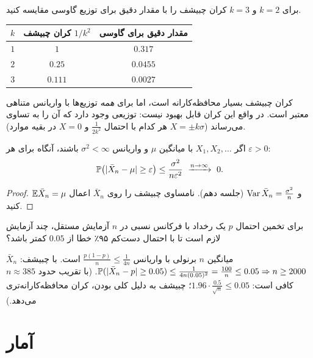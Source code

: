 \begin{example}
برای $k=2$ و $k=3$ کران چبیشف را با مقدار دقیق برای توزیع گاوسی مقایسه کنید.
\begin{solution}
\begin{center}
\renewcommand{\arraystretch}{1.3}
\begin{tabular}{c|c|c}
$k$ & کران چبیشف $1/k^2$ & مقدار دقیق برای گاوسی\\\hline
$1$ & $1$ & $0.317$\\
$2$ & $0.25$ & $0.0455$\\
$3$ & $0.111$ & $0.0027$
\end{tabular}
\end{center}
کران چبیشف بسیار محافظه‌کارانه است، اما برای \emph{همه} توزیع‌ها با واریانس متناهی معتبر است. در واقع این کران قابل بهبود نیست: توزیعی وجود دارد که آن را به تساوی می‌رساند ($X=\pm k\sigma$ هر کدام با احتمال $\frac1{2k^2}$ و $X=0$ در بقیه موارد).
\end{solution}
\end{example}

\begin{theorem}
اگر $X_1,X_2,\ldots$  با میانگین $\mu$ و واریانس $\sigma^2<\infty$ باشند، آنگاه برای هر $\varepsilon>0$:
\[
\Prob\big(|\bar X_n-\mu|\ge\varepsilon\big)\le\frac{\sigma^2}{n\varepsilon^2}\ \xrightarrow{n\to\infty}\ 0 .
\]
\end{theorem}
\begin{proof}
$\mathbb{E}\bar X_n=\mu$ و $\operatorname{Var}\bar X_n=\frac{\sigma^2}{n}$ (جلسه دهم). نامساوی چبیشف را روی $\bar X_n$ اعمال کنید.
\end{proof}

\begin{example}
برای تخمین احتمال $p$ یک رخداد با فرکانس نسبی در $n$ آزمایش مستقل، چند آزمایش لازم است تا با احتمال دست‌کم ۹۵٪ خطا از $0.05$ کمتر باشد؟
\begin{solution}
$\bar X_n$ میانگین $n$ برنولی با واریانس $\frac{p(1-p)}{n}\le\frac{1}{4n}$ است. با چبیشف:
$\mathbb{P}(|\bar X_n-p|\ge0.05)\le\frac{1}{4n(0.05)^2}=\frac{100}{n}\le0.05\Rightarrow n\ge2000$.
(با تقریب  حدود $n\approx385$ کافی است: $1.96\cdot\frac{0.5}{\sqrt n}\le0.05$؛ چبیشف به دلیل کلی بودن، کران محافظه‌کارانه‌تری می‌دهد.)
\end{solution}
\end{example}

\section{آمار }


